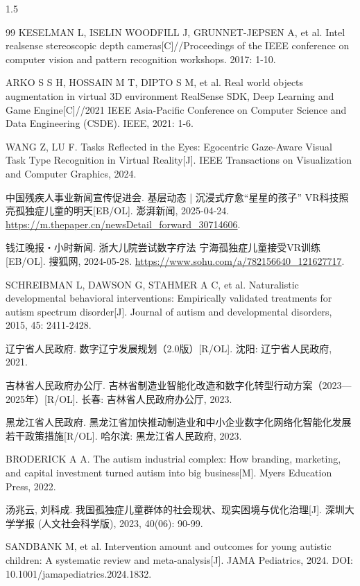 \documentclass[zihao=-4]{ctexart}
\begin{document}
\begin{spacing}{1.5}
\begin{thebibliography}{99}
 KESELMAN L, ISELIN WOODFILL J, GRUNNET-JEPSEN A, et al. Intel realsense stereoscopic depth cameras[C]//Proceedings of the IEEE conference on computer vision and pattern recognition workshops. 2017: 1-10.

 ARKO S S H, HOSSAIN M T, DIPTO S M, et al. Real world objects augmentation in virtual 3D environment RealSense SDK, Deep Learning and Game Engine[C]//2021 IEEE Asia-Pacific Conference on Computer Science and Data Engineering (CSDE). IEEE, 2021: 1-6.

 WANG Z, LU F. Tasks Reflected in the Eyes: Egocentric Gaze-Aware Visual Task Type Recognition in Virtual Reality[J]. IEEE Transactions on Visualization and Computer Graphics, 2024.

 中国残疾人事业新闻宣传促进会. 基层动态 | 沉浸式疗愈“星星的孩子” VR科技照亮孤独症儿童的明天[EB/OL]. 澎湃新闻, 2025-04-24. \url{https://m.thepaper.cn/newsDetail_forward_30714606}.

 钱江晚报・小时新闻. 浙大儿院尝试数字疗法 宁海孤独症儿童接受VR训练[EB/OL]. 搜狐网, 2024-05-28. \url{https://www.sohu.com/a/782156640_121627717}.

 SCHREIBMAN L, DAWSON G, STAHMER A C, et al. Naturalistic developmental behavioral interventions: Empirically validated treatments for autism spectrum disorder[J]. Journal of autism and developmental disorders, 2015, 45: 2411-2428.

 辽宁省人民政府. 数字辽宁发展规划（2.0版）[R/OL]. 沈阳: 辽宁省人民政府, 2021.

 吉林省人民政府办公厅. 吉林省制造业智能化改造和数字化转型行动方案（2023—2025年）[R/OL]. 长春: 吉林省人民政府办公厅, 2023.

 黑龙江省人民政府. 黑龙江省加快推动制造业和中小企业数字化网络化智能化发展若干政策措施[R/OL]. 哈尔滨: 黑龙江省人民政府, 2023.

 BRODERICK A A. The autism industrial complex: How branding, marketing, and capital investment turned autism into big business[M]. Myers Education Press, 2022.

 汤兆云, 刘科成. 我国孤独症儿童群体的社会现状、现实困境与优化治理[J]. 深圳大学学报 (人文社会科学版), 2023, 40(06): 90-99.

 SANDBANK M, et al. Intervention amount and outcomes for young autistic children: A systematic review and meta-analysis[J]. JAMA Pediatrics, 2024. DOI: 10.1001/jamapediatrics.2024.1832.


\end{thebibliography}
\end{spacing}
\end{document}
